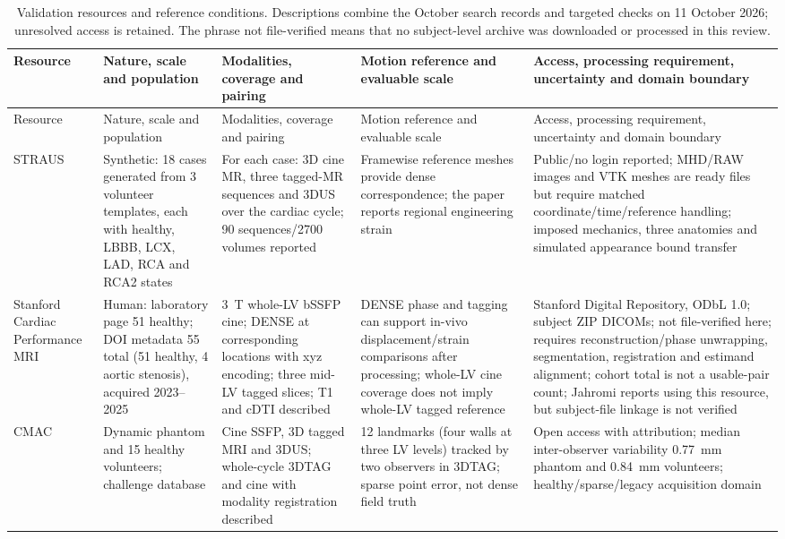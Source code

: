 \documentclass[11pt,a4paper]{article}
\begin{document}
{\scriptsize\sloppy
\setlength{\tabcolsep}{3pt}
\begin{longtable}{L{0.127\textwidth}L{0.162\textwidth}L{0.173\textwidth}L{0.196\textwidth}L{0.266\textwidth}}
\caption{Validation resources and reference conditions. Descriptions combine the October search records and targeted checks on 11 October 2026; unresolved access is retained. The phrase not file-verified means that no subject-level archive was downloaded or processed in this review.}\\
\toprule
Resource & Nature, scale and population & Modalities, coverage and pairing & Motion reference and evaluable scale & Access, processing requirement, uncertainty and domain boundary \\
\midrule
\endfirsthead
\toprule
Resource & Nature, scale and population & Modalities, coverage and pairing & Motion reference and evaluable scale & Access, processing requirement, uncertainty and domain boundary \\
\midrule
\endhead
STRAUS~\cite{zhou2018straus,strausdata} & Synthetic: 18 cases generated from 3 volunteer templates, each with healthy, LBBB, LCX, LAD, RCA and RCA2 states & For each case: 3D cine MR, three tagged-MR sequences and 3DUS over the cardiac cycle; 90 sequences/2700 volumes reported & Framewise reference meshes provide dense correspondence; the paper reports regional engineering strain & Public/no login reported; MHD/RAW images and VTK meshes are ready files but require matched coordinate/time/reference handling; imposed mechanics, three anatomies and simulated appearance bound transfer \\
\addlinespace
Stanford Cardiac Performance MRI~\cite{stanforddata} & Human: laboratory page 51 healthy; DOI metadata 55 total (51 healthy, 4 aortic stenosis), acquired 2023--2025 & 3~T whole-LV bSSFP cine; DENSE at corresponding locations with xyz encoding; three mid-LV tagged slices; T1 and cDTI described & DENSE phase and tagging can support in-vivo displacement/strain comparisons after processing; whole-LV cine coverage does not imply whole-LV tagged reference & Stanford Digital Repository, ODbL 1.0; subject ZIP DICOMs; not file-verified here; requires reconstruction/phase unwrapping, segmentation, registration and estimand alignment; cohort total is not a usable-pair count; Jahromi reports using this resource, but subject-file linkage is not verified \\
\addlinespace
CMAC~\cite{tobongomez2013cmac,cmac2011} & Dynamic phantom and 15 healthy volunteers; challenge database & Cine SSFP, 3D tagged MRI and 3DUS; whole-cycle 3DTAG and cine with modality registration described & 12 landmarks (four walls at three LV levels) tracked by two observers in 3DTAG; sparse point error, not dense field truth & Open access with attribution; median inter-observer variability 0.77~mm phantom and 0.84~mm volunteers; healthy/sparse/legacy acquisition domain \\

\end{longtable}}
\end{document}
